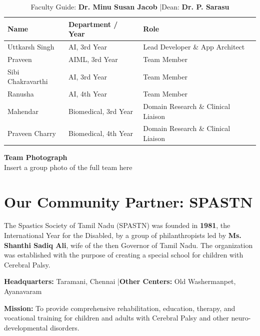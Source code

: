 \documentclass[11pt,a4paper]{article}
\begin{document}
\begin{table}[H]
\centering
\renewcommand{\arraystretch}{1.5}
\begin{tabularx}{\textwidth}{l l X}
\toprule
\textbf{Name} & \textbf{Department / Year} & \textbf{Role} \\
\midrule
Uttkarsh Singh        & AI, 3rd Year            & Lead Developer \& App Architect \\
Praveen               & AIML, 3rd Year          & Team Member \\
Sibi Chakravarthi      & AI, 3rd Year            & Team Member \\
Ranusha               & AI, 4th Year            & Team Member \\
Mahendar              & Biomedical, 3rd Year    & Domain Research \& Clinical Liaison \\
Praveen Charry        & Biomedical, 4th Year    & Domain Research \& Clinical Liaison \\
\bottomrule
\end{tabularx}
\caption*{\small Faculty Guide: \textbf{Dr. Minu Susan Jacob} \quad|\quad Dean: \textbf{Dr. P. Sarasu}}
\end{table}

\vspace{0.5cm}
\begin{center}
    \begin{photoplaceholder}[height=6cm, width=0.85\textwidth]
        \vspace{2cm}
        {\large\bfseries Team Photograph}\\[0.3cm]
        {\small Insert a group photo of the full team here}
    \end{photoplaceholder}
\end{center}

\section{Our Community Partner: SPASTN}

\begin{highlightbox}
The Spastics Society of Tamil Nadu (SPASTN) was founded in \textbf{1981}, the International Year for the Disabled, by a group of philanthropists led by \textbf{Ms. Shanthi Sadiq Ali}, wife of the then Governor of Tamil Nadu. The organization was established with the purpose of creating a special school for children with Cerebral Palsy.

\textbf{Headquarters:} Taramani, Chennai \quad|\quad \textbf{Other Centers:} Old Washermanpet, Ayanavaram

\textbf{Mission:} To provide comprehensive rehabilitation, education, therapy, and vocational training for children and adults with Cerebral Palsy and other neuro-developmental disorders.
\end{highlightbox}
\end{document}

